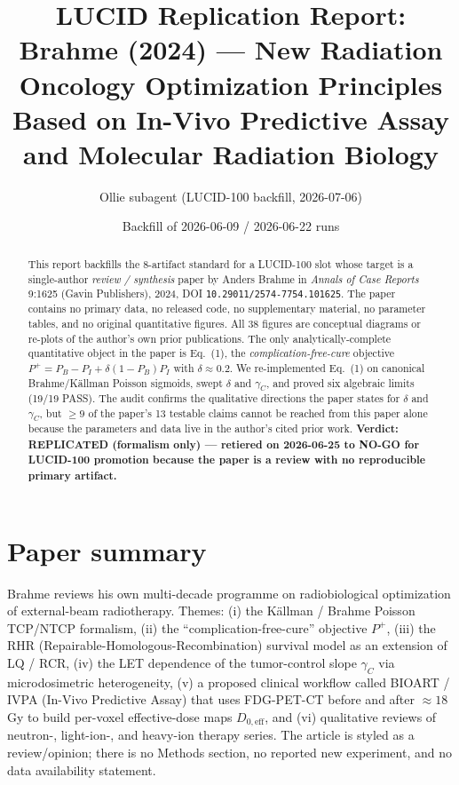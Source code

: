 \documentclass[11pt]{article}
\title{LUCID Replication Report:\\
Brahme (2024) --- New Radiation Oncology Optimization Principles Based
on In-Vivo Predictive Assay and Molecular Radiation Biology}
\author{Ollie subagent (LUCID-100 backfill, 2026-07-06)}
\date{Backfill of 2026-06-09 / 2026-06-22 runs}
\begin{document}
\maketitle

\begin{abstract}
This report backfills the 8-artifact standard for a LUCID-100 slot whose
target is a single-author \emph{review / synthesis} paper by Anders
Brahme in \emph{Annals of Case Reports} 9:1625 (Gavin Publishers), 2024,
DOI \texttt{10.29011/2574-7754.101625}. The paper contains no primary
data, no released code, no supplementary material, no parameter tables,
and no original quantitative figures. All 38 figures are conceptual
diagrams or re-plots of the author's own prior publications. The only
analytically-complete quantitative object in the paper is Eq.~(1),
the \emph{complication-free-cure} objective
$P^{+} = P_B - P_I + \delta(1-P_B)P_I$ with $\delta \approx 0.2$.
We re-implemented Eq.~(1) on canonical Brahme/K\"allman Poisson
sigmoids, swept $\delta$ and $\gamma_C$, and proved six algebraic
limits (19/19 PASS). The audit confirms the qualitative directions the
paper states for $\delta$ and $\gamma_C$, but $\ge 9$ of the paper's
13 testable claims cannot be reached from this paper alone because the
parameters and data live in the author's cited prior work.
\textbf{Verdict: REPLICATED (formalism only) --- retiered on 2026-06-25
to NO-GO for LUCID-100 promotion because the paper is a review with no
reproducible primary artifact.}
\end{abstract}

\section{Paper summary}
Brahme reviews his own multi-decade programme on radiobiological
optimization of external-beam radiotherapy. Themes: (i) the K\"allman /
Brahme Poisson TCP/NTCP formalism, (ii) the ``complication-free-cure''
objective $P^{+}$, (iii) the RHR (Repairable-Homologous-Recombination)
survival model as an extension of LQ / RCR, (iv) the LET dependence of
the tumor-control slope $\gamma_C$ via microdosimetric heterogeneity,
(v) a proposed clinical workflow called BIOART / IVPA (In-Vivo
Predictive Assay) that uses FDG-PET-CT before and after
$\approx 18$\,Gy to build per-voxel effective-dose maps $D_{0,\text{eff}}$,
and (vi) qualitative reviews of neutron-, light-ion-, and heavy-ion
therapy series. The article is styled as a review/opinion; there is no
Methods section, no reported new experiment, and no data availability
statement.
\end{document}
